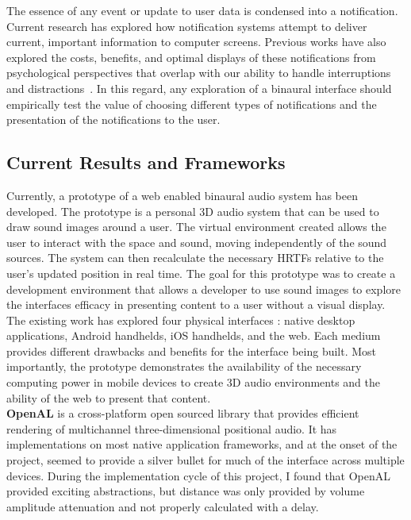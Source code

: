 The essence of any event or update to user data is condensed into a
notification.  Current research has explored how notification systems attempt to
deliver current, important information to computer screens.  Previous works have
also explored the costs, benefits, and optimal displays of these notifications
from psychological perspectives that overlap with our ability to handle
interruptions and distractions~\cite{McCrickard2003509,
cutrell2001notification}. In this regard, any exploration of a binaural interface
should empirically test the value of choosing different types of notifications
and the presentation of the notifications to the user.


\subsection{                  Current Results and Frameworks                  }

Currently, a prototype of a web enabled binaural audio system has been developed.
The prototype is a personal 3D audio system that can be used to draw sound images
around a user. The virtual environment created allows the user to interact with 
the space and sound, moving independently of the sound sources. The system can 
then recalculate the necessary HRTFs relative to the user's updated position in
real time. The goal for this prototype was to create a development environment 
that allows a developer to use sound images to explore the interfaces efficacy 
in presenting content to a user without a visual display. The existing work
has explored four physical interfaces : native desktop applications, Android
handhelds, iOS handhelds, and the web. Each medium provides different drawbacks
and benefits for the interface being built. Most importantly, the prototype 
demonstrates the availability of the necessary computing power in mobile 
devices to create 3D audio environments and the ability of the web to present 
that content.\\

\textbf{OpenAL} is a cross-platform open sourced library that provides
efficient rendering of multichannel three-dimensional positional audio.  It has
implementations on most native  application frameworks, and at the onset of the
project, seemed to provide a silver bullet for much of the interface across
multiple devices.  During the implementation cycle of this project, I found
that OpenAL provided exciting abstractions, but distance was only provided by
volume amplitude attenuation and not properly calculated with a delay.

